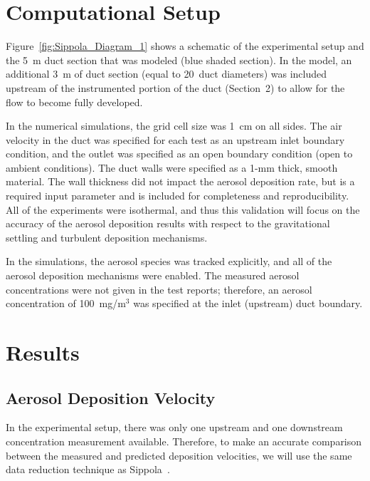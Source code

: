 \clearpage


\section{Computational Setup}
\label{sec:Computational Setup}

Figure~\ref{fig:Sippola_Diagram_1} shows a schematic of the experimental setup and the 5~m duct section that was modeled (blue shaded section). In the model, an additional 3~m of duct section (equal to 20~duct diameters) was included upstream of the instrumented portion of the duct (Section~2) to allow for the flow to become fully developed.

In the numerical simulations, the grid cell size was 1~cm on all sides. The air velocity in the duct was specified for each test as an upstream inlet boundary condition, and the outlet was specified as an open boundary condition (open to ambient conditions). The duct walls were specified as a 1-mm thick, smooth material. The wall thickness did not impact the aerosol deposition rate, but is a required input parameter and is included for completeness and reproducibility. All of the experiments were isothermal, and thus this validation will focus on the accuracy of the aerosol deposition results with respect to the gravitational settling and turbulent deposition mechanisms.

In the simulations, the aerosol species was tracked explicitly, and all of the aerosol deposition mechanisms were enabled. The measured aerosol concentrations were not given in the test reports; therefore, an aerosol concentration of 100~mg/m$^3$ was specified at the inlet (upstream) duct boundary.

\section{Results}
\label{sec:Results}

\subsection{Aerosol Deposition Velocity}

In the experimental setup, there was only one upstream and one downstream concentration measurement available. Therefore, to make an accurate comparison between the measured and predicted deposition velocities, we will use the same data reduction technique as Sippola~\cite{Sippola:2002,Sippola:2010}.


